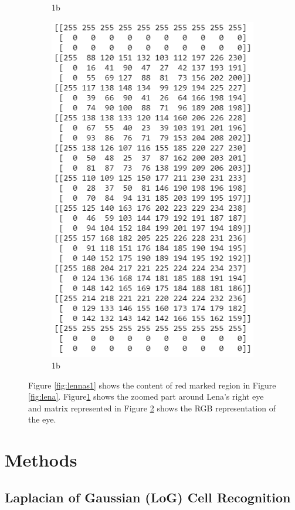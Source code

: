 \documentclass[pdftex,12pt,a4paper]{report}
\begin{document}
\begin{figure}[h]
\begin{subfigure}{.5\textwidth}
  \caption{1b}
  \label{fig:lennas2}
\end{subfigure}
\centering
\begin{subfigure}{.5\textwidth}
  \includegraphics[width=.8\linewidth]{images/lenna_rbg}
  \caption{1b}
  \label{fig:lennas3}
\end{subfigure}
\caption{Figure \ref{fig:lennas1} shows the content of red marked region in Figure \ref{fig:lena}. Figure\ref{fig:lennas2} shows the zoomed part around Lena's right eye and matrix represented in Figure \ref{fig:lennas3} shows the RGB representation of the eye.}
\label{fig:lennas}
\end{figure}

\section{Methods}

\subsection{Laplacian of Gaussian (LoG) Cell Recognition}
\end{document}
